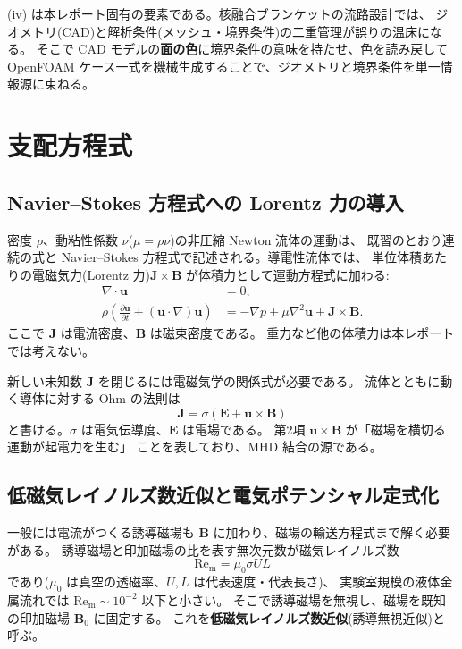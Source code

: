 \documentclass{ltjsarticle}   %
\newcommand{\Rm}{\mathrm{Re}_\mathrm{m}}
\begin{document}
(iv) は本レポート固有の要素である。核融合ブランケットの流路設計では、
ジオメトリ(CAD)と解析条件(メッシュ・境界条件)の二重管理が誤りの温床になる。
そこで CAD モデルの\textbf{面の色}に境界条件の意味を持たせ、色を読み戻して
OpenFOAM ケース一式を機械生成することで、ジオメトリと境界条件を単一情報源に束ねる。

\section{支配方程式}

\subsection{Navier--Stokes 方程式への Lorentz 力の導入}

密度 $\rho$、動粘性係数 $\nu$($\mu=\rho\nu$)の非圧縮 Newton 流体の運動は、
既習のとおり連続の式と Navier--Stokes 方程式で記述される。導電性流体では、
単位体積あたりの電磁気力(Lorentz 力)$\boldsymbol{J}\times\boldsymbol{B}$
が体積力として運動方程式に加わる:
\begin{align}
  \nabla\cdot\boldsymbol{u} &= 0, \\
  \rho\left(\frac{\partial \boldsymbol{u}}{\partial t}
    + (\boldsymbol{u}\cdot\nabla)\boldsymbol{u}\right)
  &= -\nabla p + \mu\nabla^2\boldsymbol{u}
    + \boldsymbol{J}\times\boldsymbol{B}.
  \label{eq:momentum}
\end{align}
ここで $\boldsymbol{J}$ は電流密度、$\boldsymbol{B}$ は磁束密度である。
重力など他の体積力は本レポートでは考えない。

新しい未知数 $\boldsymbol{J}$ を閉じるには電磁気学の関係式が必要である。
流体とともに動く導体に対する Ohm の法則は
\begin{equation}
  \boldsymbol{J} = \sigma\left(\boldsymbol{E} + \boldsymbol{u}\times\boldsymbol{B}\right)
  \label{eq:ohm}
\end{equation}
と書ける。$\sigma$ は電気伝導度、$\boldsymbol{E}$ は電場である。
第2項 $\boldsymbol{u}\times\boldsymbol{B}$ が「磁場を横切る運動が起電力を生む」
ことを表しており、MHD 結合の源である。

\subsection{低磁気レイノルズ数近似と電気ポテンシャル定式化}

一般には電流がつくる誘導磁場も $\boldsymbol{B}$ に加わり、磁場の輸送方程式まで解く必要がある。
誘導磁場と印加磁場の比を表す無次元数が磁気レイノルズ数
\begin{equation}
  \Rm = \mu_0 \sigma U L
\end{equation}
であり($\mu_0$ は真空の透磁率、$U,L$ は代表速度・代表長さ)、
実験室規模の液体金属流れでは $\Rm \sim 10^{-2}$ 以下と小さい。
そこで誘導磁場を無視し、磁場を既知の印加磁場 $\boldsymbol{B}_0$ に固定する。
これを\textbf{低磁気レイノルズ数近似}(誘導無視近似)と呼ぶ。
\end{document}
